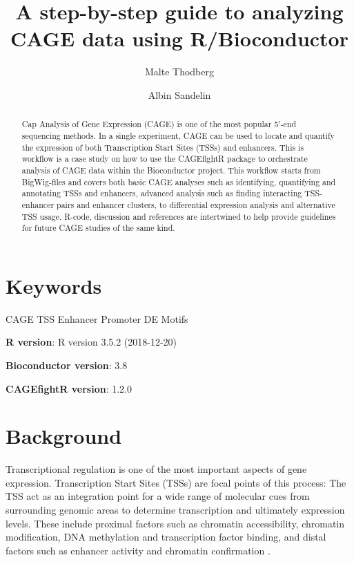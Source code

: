 \documentclass[9pt,a4paper,]{extarticle}
\begin{document}
\pagestyle{front}

\title{A step-by-step guide to analyzing CAGE data using R/Bioconductor}

\author[1]{Malte Thodberg}
\author[1]{Albin Sandelin}

\maketitle
\thispagestyle{front}

\begin{abstract}
Cap Analysis of Gene Expression (CAGE) is one of the most popular 5'-end sequencing methods. In a single experiment, CAGE can be used to locate and quantify the expression of both Transcription Start Sites (TSSs) and enhancers. This is workflow is a case study on how to use the CAGEfightR package to orchestrate analysis of CAGE data within the Bioconductor project. This workflow starts from BigWig-files and covers both basic CAGE analyses such as identifying, quantifying and annotating TSSs and enhancers, advanced analysis such as finding interacting TSS-enhancer pairs and enhancer clusters, to differential expression analysis and alternative TSS usage. R-code, discussion and references are intertwined to help provide guidelines for future CAGE studies of the same kind.
\end{abstract}

\section*{Keywords}
CAGE TSS Enhancer Promoter DE Motifs


\clearpage
\pagestyle{main}

\textbf{R version}: R version 3.5.2 (2018-12-20)

\textbf{Bioconductor version}: 3.8

\textbf{CAGEfightR version}: 1.2.0

\section{Background}\label{background}

Transcriptional regulation is one of the most important aspects of gene expression. Transcription Start Sites (TSSs) are focal points of this process: The TSS act as an integration point for a wide range of molecular cues from surrounding genomic areas to determine transcription and ultimately expression levels. These include proximal factors such as chromatin accessibility, chromatin modification, DNA methylation and transcription factor binding, and distal factors such as enhancer activity and chromatin confirmation \citep{Smale2003, Kadonaga2012, Lenhard2012, Haberle2018}.
\end{document}
